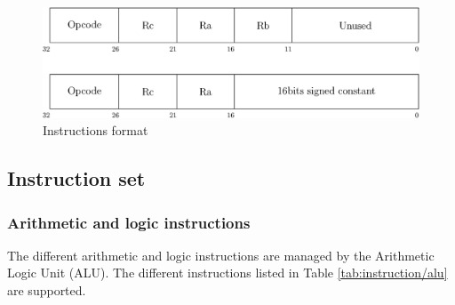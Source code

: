 \begin{figure}[H]
    \centering
    \includegraphics[scale=0.6]{Chapter3-CPU/res/instruction}
    \caption{Instructions format}
    \label{fig:instructions/format}
\end{figure}

\subsection{Instruction set}

\subsubsection*{Arithmetic and logic instructions}

The different arithmetic and logic instructions are managed by the Arithmetic Logic Unit (ALU). The 
different instructions listed in Table \ref{tab:instruction/alu} are supported.

